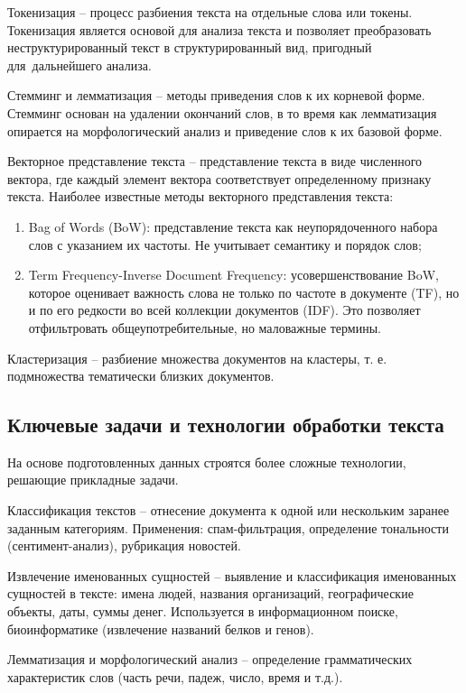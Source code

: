 \documentclass{ou}
\begin{document}
Токенизация -- процесс разбиения текста на отдельные слова или токены. Токенизация является основой для анализа текста и позволяет преобразовать неструктурированный текст в структурированный вид, пригодный для~дальнейшего анализа. 

Стемминг и лемматизация -- методы приведения слов к их корневой форме. Стемминг основан на удалении окончаний слов, в то время как лемматизация опирается на морфологический анализ и приведение слов к их базовой форме. 

Векторное представление текста -- представление текста в виде численного вектора, где каждый элемент вектора соответствует определенному признаку текста. Наиболее известные методы векторного представления текста:
\begin{enumerate}[leftmargin=0em, itemindent=3.75em, nosep, label=\arabic*)]
\item Bag of Words (BoW): представление текста как неупорядоченного набора слов с указанием их частоты. Не учитывает семантику и порядок слов;
\item Term Frequency-Inverse Document Frequency: усовершенствование BoW, которое оценивает важность слова не только по частоте в документе (TF), но и по его редкости во всей коллекции документов (IDF). Это позволяет отфильтровать общеупотребительные, но маловажные термины.
\end{enumerate}

Кластеризация -- разбиение множества документов на кластеры, т. е. подмножества тематически близких документов.
\subsection{Ключевые задачи и технологии обработки текста}
На основе подготовленных данных строятся более сложные технологии, решающие прикладные задачи.

Классификация текстов -- отнесение документа к одной или нескольким заранее заданным категориям. Применения: спам-фильтрация, определение тональности (сентимент-анализ), рубрикация новостей.

Извлечение именованных сущностей -- выявление и классификация именованных сущностей в тексте: имена людей, названия организаций, географические объекты, даты, суммы денег. Используется в информационном поиске, биоинформатике (извлечение названий белков и генов).

Лемматизация и морфологический анализ -- определение грамматических характеристик слов (часть речи, падеж, число, время и т.д.).
\end{document}
